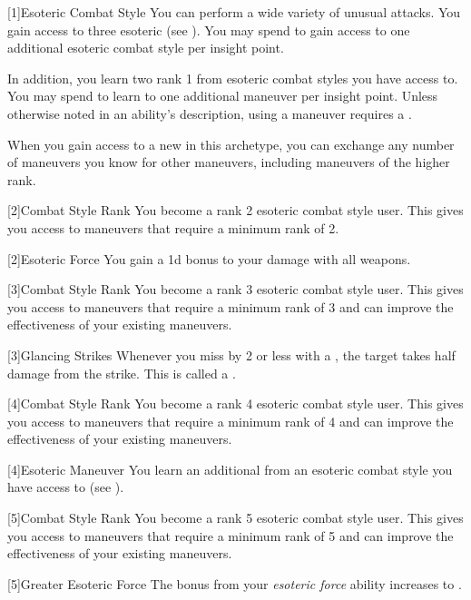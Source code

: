         {
            [1]{Esoteric Combat Style}
            You can perform a wide variety of unusual attacks.
            You gain access to three esoteric  (see ).
            You may spend  to gain access to one additional esoteric combat style per insight point.

            In addition, you learn two rank 1  from esoteric combat styles you have access to.
            You may spend  to learn to one additional maneuver per insight point.
            Unless otherwise noted in an ability's description, using a maneuver requires a .

            When you gain access to a new  in this archetype,
                you can exchange any number of maneuvers you know for other maneuvers,
                including maneuvers of the higher rank.
        }

        {
            [2]{Combat Style Rank} You become a rank 2 esoteric combat style user.
            This gives you access to maneuvers that require a minimum rank of 2.

            [2]{Esoteric Force} You gain a \plus1d bonus to your damage with all weapons.
        }

        {
            [3]{Combat Style Rank} You become a rank 3 esoteric combat style user.
            This gives you access to maneuvers that require a minimum rank of 3 and can improve the effectiveness of your existing maneuvers.

            [3]{Glancing Strikes} Whenever you miss by 2 or less with a , the target takes half damage from the strike.
            This is called a .
        }

        {
            [4]{Combat Style Rank} You become a rank 4 esoteric combat style user.
            This gives you access to maneuvers that require a minimum rank of 4 and can improve the effectiveness of your existing maneuvers.

            [4]{Esoteric Maneuver}
            You learn an additional  from an esoteric combat style you have access to (see ).
        }

        {
            [5]{Combat Style Rank} You become a rank 5 esoteric combat style user.
            This gives you access to maneuvers that require a minimum rank of 5 and can improve the effectiveness of your existing maneuvers.

            [5]{Greater Esoteric Force} The bonus from your \textit{esoteric force} ability increases to .
        }

